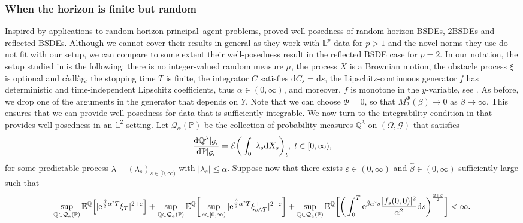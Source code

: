 \documentclass[10pt]{article} %
\newcommand\cE{\mathcal E}
\newcommand\cG{\mathcal G}
\newcommand\cQ{\mathcal Q}
\newcommand{\smalltext}[1]{\text{\fontsize{4}{4}\selectfont$#1$}}
\def \E{\mathbb{E}}
\def \L{\mathbb{L}}
\def \P{\mathbb{P}}
\def \Q{\mathbb{Q}}
\newcommand{\1}{\mathbf{1}}
\def\d{\mathrm{d}}
\begin{document}
\subsubsection{When the horizon is finite but random}

Inspired by applications to random horizon principal--agent problems, \citeauthor*{lin2020second} \cite{lin2020second} proved well-posedness of random horizon BSDEs, 2BSDEs and reflected BSDEs. Although we cannot cover their results in general as they work with $\L^p$-data for $p > 1$ and the novel norms they use do not fit with our setup, we can compare to some extent their well-posedness result in the reflected BSDE case for $p = 2$. In our notation, the setup studied in \cite{lin2020second} is the following: there is no integer-valued random measure $\mu$, the process $X$ is a Brownian motion, the obstacle process $\xi$ is optional and c\`adl\`ag, the stopping time $T$ is finite, the integrator $C$ satisfies $\d C_s = \d s$, the Lipschitz-continuous generator $f$ has deterministic and time-independent Lipschitz coefficients, thus $\alpha \in (0,\infty)$, and moreover, $f$ is monotone in the $y$-variable, see \cite[Assumption 3.1.$(ii)$]{lin2020second}. As before, we drop one of the arguments in the generator that depends on $Y$. Note that we can choose $\Phi = 0$, so that $M^\Phi_2(\beta) \longrightarrow 0$ as $\beta \longrightarrow\infty$. This ensures that we can provide well-posedness for data that is sufficiently integrable. We now turn to the integrability condition in \cite{lin2020second} that provides well-posedness in an $\L^2$-setting. Let $\cQ_\alpha(\P)$ be the collection of probability measures $\Q^\lambda$ on $(\Omega,\cG)$ that satisfies
\begin{equation*}
	\frac{\d \Q^\lambda|_{\cG_\smalltext{t}}}{\d \P|_{\cG_\smalltext{t}}} = \cE\bigg(\int_0^\cdot \lambda_s \d X_s\bigg)_t, \; t \in [0,\infty),
\end{equation*}
for some predictable process $\lambda = (\lambda_s)_{s \in [0,\infty)}$ with $|\lambda_s| \leq \alpha$. Suppose now that there exists $\varepsilon \in (0,\infty)$ and $\hat\beta \in (0,\infty)$ sufficiently large such that 
\begin{equation*}
	\sup_{\Q \in \cQ_\smalltext{\alpha}(\P)}\E^\Q\Big[|\mathrm{e}^{\frac{\hat\beta}{2}\alpha^\smalltext{2} T}\xi_T|^{2+\varepsilon}\Big] + \sup_{\Q \in \cQ_\smalltext{\alpha}(\P)}\E^\Q\bigg[\sup_{s \in [0,\infty)}|\mathrm{e}^{\frac{\hat\beta}{2}\alpha^\smalltext{2} T}\xi^+_{s \land T}|^{2+\varepsilon}\bigg] + \sup_{\Q \in \cQ_\smalltext{\alpha}(\P)}\E^\Q\bigg[\bigg(\int_0^T\mathrm{e}^{\hat\beta\alpha^\smalltext{2} s}\frac{|f_s(0,0)|^2}{\alpha^2}\d s\bigg)^{\frac{2+\varepsilon}{2}}\bigg] < \infty.
\end{equation*}
\end{document}
